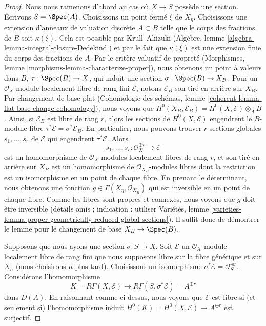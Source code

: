 \begin{proof}
Nous nous ramenons d'abord au cas où $X \to S$ possède une section. Écrivons $S = \Spec(A)$.
Choisissons un point fermé $\xi$ de $X_\eta$. Choisissons une extension
d'anneaux de valuation discrète $A \subset B$ telle que le corps des fractions
de $B$ soit $\kappa(\xi)$. Cela est possible par Krull--Akizuki
(Algèbre, lemme \ref{algebra-lemma-integral-closure-Dedekind})
et par le fait que $\kappa(\xi)$ est une extension finie du
corps des fractions de $A$.
Par le critère valuatif de propreté
(Morphismes, lemme \ref{morphisms-lemma-characterize-proper}),
nous obtenons un point à valeurs dans $B$, $\tau : \Spec(B) \to X$,
qui induit une section $\sigma : \Spec(B) \to X_B$.
Pour un $\mathcal{O}_X$-module localement libre de rang fini $\mathcal{E}$,
notons $\mathcal{E}_B$ son tiré en arrière sur $X_B$.
Par changement de base plat
(Cohomologie des schémas, lemme \ref{coherent-lemma-flat-base-change-cohomology}),
nous voyons que $H^0(X_B, \mathcal{E}_B) = H^0(X, \mathcal{E}) \otimes_A B$.
Ainsi, si $\mathcal{E}_B$ est libre de rang $r$, alors les sections de
$H^0(X, \mathcal{E})$ engendrent le $B$-module libre
$\tau^*\mathcal{E} = \sigma^*\mathcal{E}_B$.
En particulier, nous pouvons trouver $r$ sections globales $s_1, \ldots, s_r$
de $\mathcal{E}$ qui engendrent $\tau^*\mathcal{E}$. Alors
$$
s_1, \ldots, s_r :
\mathcal{O}_X^{\oplus r}
\longrightarrow
\mathcal{E}
$$
est un homomorphisme de $\mathcal{O}_X$-modules localement libres de rang $r$,
et son tiré en arrière sur $X_B$ est un homomorphisme de $\mathcal{O}_{X_B}$-modules libres
dont la restriction est un isomorphisme en un point de chaque fibre.
En prenant le déterminant, nous obtenons une fonction
$g \in \Gamma(X_\eta, \mathcal{O}_{X_B})$
qui est inversible en un point de chaque fibre.
Comme les fibres sont propres et connexes, nous voyons que $g$
doit être inversible (détails omis ; indication : utiliser Variétés, lemme
\ref{varieties-lemma-proper-geometrically-reduced-global-sections}).
Il suffit donc de démontrer le lemme pour le changement de base $X_B \to \Spec(B)$.

\medskip\noindent
Supposons que nous ayons une section $\sigma : S \to X$. Soit $\mathcal{E}$
un $\mathcal{O}_X$-module localement libre de rang fini que nous supposons
libre sur la fibre générique et sur $X_n$ (nous choisirons $n$ plus tard).
Choisissons un isomorphisme $\sigma^*\mathcal{E} = \mathcal{O}_S^{\oplus r}$.
Considérons l'homomorphisme
$$
K = R\Gamma(X, \mathcal{E}) \longrightarrow
R\Gamma(S, \sigma^*\mathcal{E}) = A^{\oplus r}
$$
dans $D(A)$. En raisonnant comme ci-dessus, nous voyons que $\mathcal{E}$ est libre si (et seulement si)
l'homomorphisme induit $H^0(K) = H^0(X, \mathcal{E}) \to A^{\oplus r}$ est surjectif.


\end{proof}
